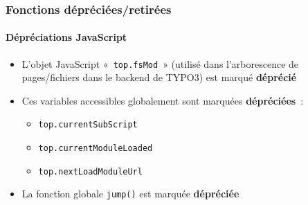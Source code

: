 %

\begin{frame}[fragile]
	\frametitle{Fonctions dépréciées/retirées}
	\framesubtitle{Dépréciations JavaScript}


	\begin{itemize}
		\item L'objet JavaScript «~\texttt{top.fsMod}~» (utilisé dans l'arborescence de pages/fichiers
			dans le backend de TYPO3) est marqué \textbf{déprécié}
		\item Ces variables accessibles globalement sont marquées
			\textbf{dépréciées}~:
			\begin{itemize}\small
				\item \texttt{top.currentSubScript}
				\item \texttt{top.currentModuleLoaded}
				\item \texttt{top.nextLoadModuleUrl}
			\end{itemize}\normalsize
		\item La fonction globale \texttt{jump()} est marquée
			\textbf{dépréciée}
	\end{itemize}

\end{frame}

